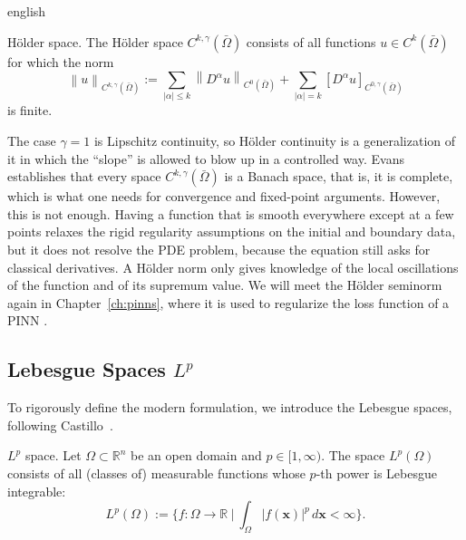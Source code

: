 \documentclass[12pt,letterpaper,twoside]{book}
\newcommand{\norm}[1]{\left\lVert #1 \right\rVert}
\newcommand{\abs}[1]{\left\lvert #1 \right\rvert}
\begin{document}
\begin{hyphenrules}{english}
\begin{definicion}{Hölder space.}\label{def:holder-space}
The Hölder space $C^{k,\gamma}(\bar\Omega)$ consists of all functions $u\in C^k(\bar\Omega)$ for which
the norm
\begin{equation}
  \norm{u}_{C^{k,\gamma}(\bar\Omega)}:=\sum_{\abs{\alpha}\le k}\norm{D^\alpha u}_{C^0(\bar\Omega)}
  +\sum_{\abs{\alpha}=k}[D^\alpha u]_{C^{0,\gamma}(\bar\Omega)}
  \label{eq:holder-norm}
\end{equation}
is finite.
\end{definicion}

The case $\gamma=1$ is Lipschitz continuity, so Hölder continuity is a generalization of it in which the
``slope'' is allowed to blow up in a controlled way. Evans~\cite{evans2010} establishes that every space
$C^{k,\gamma}(\bar\Omega)$ is a Banach space, that is, it is complete, which is what one needs for
convergence and fixed-point arguments. However, this is not enough. Having a function that is smooth
everywhere except at a few points relaxes the rigid regularity assumptions on the initial and boundary
data, but it does not resolve the PDE problem, because the equation still asks for classical
derivatives. A Hölder norm only gives knowledge of the local oscillations of the function and of its
supremum value. We will meet the Hölder seminorm again in Chapter~\ref{ch:pinns}, where it is used to
regularize the loss function of a PINN \cite{shin2020convergence}.

\subsection{Lebesgue Spaces $L^p$}\label{subsec:lp}

To rigorously define the modern formulation, we introduce the Lebesgue spaces, following
Castillo~\cite{castillo2014}.

\begin{definicion}{$L^p$ space.}\label{def:lp}
Let $\Omega\subset\mathbb{R}^n$ be an open domain and $p\in[1,\infty)$. The space $L^p(\Omega)$ consists of all
(classes of) measurable functions whose $p$-th power is Lebesgue integrable:
\begin{equation}
  L^p(\Omega):=\Big\{f:\Omega\to\mathbb{R}\ \Big|\ \int_\Omega\abs{f(\mathbf{x})}^p\,d\mathbf{x}<\infty\Big\}.
  \label{eq:lp}
\end{equation}
\end{definicion}


\end{hyphenrules}
\end{document}
